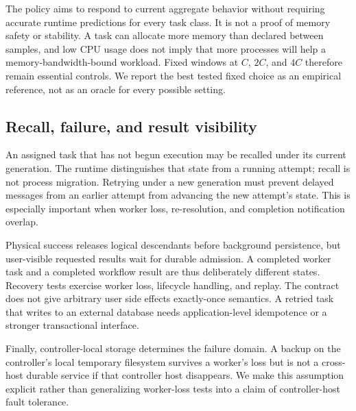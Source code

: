 The policy aims to respond to current aggregate behavior without requiring
accurate runtime predictions for every task class. It is not a proof of memory
safety or stability. A task can allocate more memory than declared between
samples, and low CPU usage does not imply that more processes will help a
memory-bandwidth-bound workload. Fixed windows at $C$, $2C$, and $4C$ therefore
remain essential controls. We report the best tested fixed choice as an
empirical reference, not as an oracle for every possible setting.

\subsection{Recall, failure, and result visibility}
An assigned task that has not begun execution may be recalled under its
current generation. The runtime distinguishes that state from a running
attempt; recall is not process migration. Retrying under a new generation
must prevent delayed messages from an earlier attempt from advancing the
new attempt's state. This is especially important when worker loss,
re-resolution, and completion notification overlap.

Physical success releases logical descendants before background persistence,
but user-visible requested results wait for durable admission. A completed
worker task and a completed workflow result are thus deliberately different
states. Recovery tests exercise worker loss, lifecycle handling, and replay.
The contract does not give arbitrary user side effects exactly-once semantics.
A retried task that writes to an external database needs application-level
idempotence or a stronger transactional interface.

Finally, controller-local storage determines the failure domain. A backup on
the controller's local temporary filesystem survives a worker's loss but is
not a cross-host durable service if that controller host disappears. We make
this assumption explicit rather than generalizing worker-loss tests into a
claim of controller-host fault tolerance.
